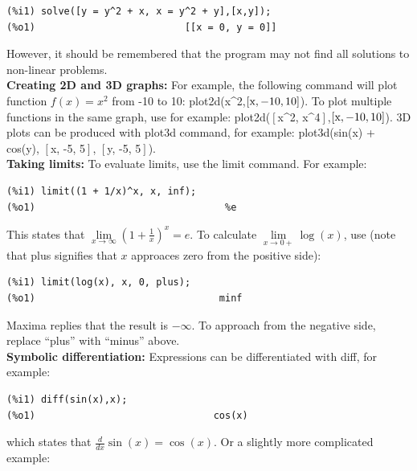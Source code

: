 \documentclass[byrevtex,amssymb,aps,pra,floatfix,letterpaper]{revtex4}
\begin{document}
\begin{verbatim}
(%i1) solve([y = y^2 + x, x = y^2 + y],[x,y]);
(%o1)                          [[x = 0, y = 0]]
\end{verbatim}

\noindent
However, it should be remembered that the program may not find all solutions to non-linear problems.\\

\noindent
\textbf{Creating 2D and 3D graphs:} For example, the following command will plot function $f(x) = x^2$ from -10 to 10: plot2d(x\^{}2,$\left[\textnormal{x},-10,10\right]$). To plot multiple functions in the same graph, use for example: plot2d($\left[\right.$x\^{}2, x\^{}4$\left.\right]$,$\left[\textnormal{x}, -10, 10\right]$). 3D plots can be produced with plot3d command, for example: plot3d(sin(x) + cos(y), $\left[\right.$x, -5, 5$\left.\right]$, $\left[\right.$y, -5, 5$\left.\right]$).\\

\noindent
\textbf{Taking limits:} To evaluate limits, use the limit command. For example:

\begin{verbatim}
(%i1) limit((1 + 1/x)^x, x, inf);
(%o1)                                 %e
\end{verbatim}

\noindent
This states that $\lim\limits_{x\rightarrow\infty} \left(1 + \frac{1}{x}\right)^x = e$. To calculate $\lim\limits_{x\rightarrow0+} \log(x)$, use (note that plus signifies that $x$ approaces zero from the positive side):

\begin{verbatim}
(%i1) limit(log(x), x, 0, plus);
(%o1)                                minf
\end{verbatim}

\noindent
Maxima replies that the result is $-\infty$. To approach from the negative side, replace ``plus'' with ``minus'' above.\\

\noindent
\textbf{Symbolic differentiation:} Expressions can be differentiated with diff, for example:

\begin{verbatim}
(%i1) diff(sin(x),x);
(%o1)                               cos(x)
\end{verbatim}

\noindent
which states that $\frac{d}{dx}\sin(x) = \cos(x)$. Or a slightly more complicated example:
\end{document}
